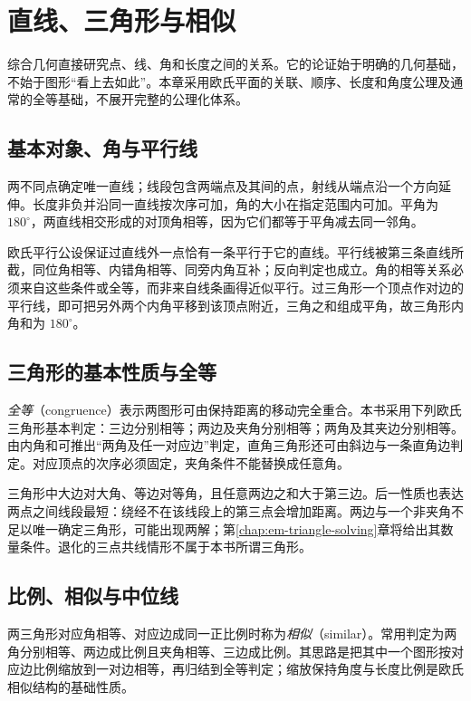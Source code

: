 \setcounter{chapter}{12} %
\chapter{直线、三角形与相似}
\label{chap:em-triangles}
综合几何直接研究点、线、角和长度之间的关系。它的论证始于明确的几何基础，不始于图形“看上去如此”。本章采用欧氏平面的关联、顺序、长度和角度公理及通常的全等基础，不展开完整的公理化体系。

\section{基本对象、角与平行线}
两不同点确定唯一直线；线段包含两端点及其间的点，射线从端点沿一个方向延伸。长度非负并沿同一直线按次序可加，角的大小在指定范围内可加。平角为 $180^\circ$，两直线相交形成的对顶角相等，因为它们都等于平角减去同一邻角。

欧氏平行公设保证过直线外一点恰有一条平行于它的直线。平行线被第三条直线所截，同位角相等、内错角相等、同旁内角互补；反向判定也成立。角的相等关系必须来自这些条件或全等，而非来自线条画得近似平行。过三角形一个顶点作对边的平行线，即可把另外两个内角平移到该顶点附近，三角之和组成平角，故三角形内角和为 $180^\circ$。

\section{三角形的基本性质与全等}
\emph{全等}（congruence）表示两图形可由保持距离的移动完全重合。本书采用下列欧氏三角形基本判定：三边分别相等；两边及夹角分别相等；两角及其夹边分别相等。由内角和可推出“两角及任一对应边”判定，直角三角形还可由斜边与一条直角边判定。对应顶点的次序必须固定，夹角条件不能替换成任意角。

三角形中大边对大角、等边对等角，且任意两边之和大于第三边。后一性质也表达两点之间线段最短：绕经不在该线段上的第三点会增加距离。两边与一个非夹角不足以唯一确定三角形，可能出现两解；第\ref{chap:em-triangle-solving}章将给出其数量条件。退化的三点共线情形不属于本书所谓三角形。

\section{比例、相似与中位线}
两三角形对应角相等、对应边成同一正比例时称为\emph{相似}（similar）。常用判定为两角分别相等、两边成比例且夹角相等、三边成比例。其思路是把其中一个图形按对应边比例缩放到一对边相等，再归结到全等判定；缩放保持角度与长度比例是欧氏相似结构的基础性质。

